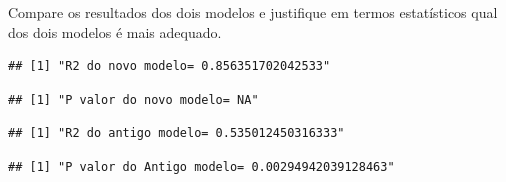 \documentclass[
]{article}
\newenvironment{Shaded}{\begin{snugshade}}{\end{snugshade}}
\newcommand{\FunctionTok}[1]{\textcolor[rgb]{0.00,0.00,0.00}{#1}}
\newcommand{\NormalTok}[1]{#1}
\newcommand{\SpecialCharTok}[1]{\textcolor[rgb]{0.00,0.00,0.00}{#1}}
\newcommand{\StringTok}[1]{\textcolor[rgb]{0.31,0.60,0.02}{#1}}
\begin{document}
Compare os resultados dos dois modelos e justifique em termos
estatísticos qual dos dois modelos é mais adequado.

\begin{Shaded}
\end{Shaded}

\begin{verbatim}
## [1] "R2 do novo modelo= 0.856351702042533"
\end{verbatim}

\begin{Shaded}
\end{Shaded}

\begin{verbatim}
## [1] "P valor do novo modelo= NA"
\end{verbatim}

\begin{Shaded}
\end{Shaded}

\begin{verbatim}
## [1] "R2 do antigo modelo= 0.535012450316333"
\end{verbatim}

\begin{Shaded}
\end{Shaded}

\begin{verbatim}
## [1] "P valor do Antigo modelo= 0.00294942039128463"
\end{verbatim}
\end{document}
